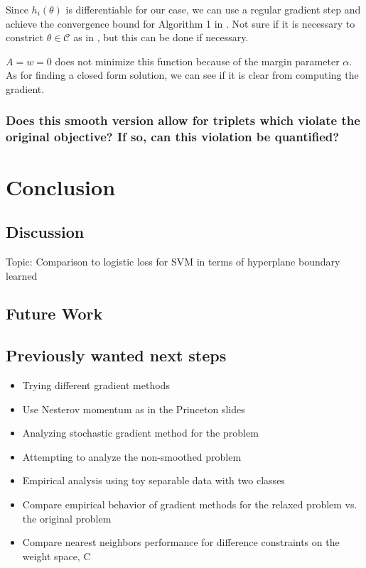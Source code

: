 \documentclass[11pt]{article}
\begin{document}
Since $h_i(\theta)$ is differentiable for our case, we can use a regular gradient step and achieve the convergence bound for Algorithm 1 in \cite{khamaru_convergence_2018}. Not sure if it is necessary to constrict $\theta \in \mathcal{C}$ as in \cite{khamaru_convergence_2018}, but this can be done if necessary.

$A = w = 0$ does not minimize this function because of the margin parameter $\alpha$. As for finding a closed form solution, we can see if it is clear from computing the gradient.

\subsubsection{Does this smooth version allow for triplets which violate the original objective? If so, can this violation be quantified?}

\section{Conclusion}

\subsection{Discussion}

Topic: Comparison to logistic loss for SVM in terms of hyperplane boundary learned

\subsection{Future Work}

\subsection{Previously wanted next steps}

\begin{itemize}
  \item Trying different gradient methods
  \item Use Nesterov momentum as in the Princeton slides
  \item Analyzing stochastic gradient method for the problem
  \item Attempting to analyze the non-smoothed problem
  \item Empirical analysis using toy separable data with two classes
  \item Compare empirical behavior of gradient methods for the relaxed problem vs. the original problem
  \item Compare nearest neighbors performance for difference constraints on the weight space, C
\end{itemize}


\end{document}
